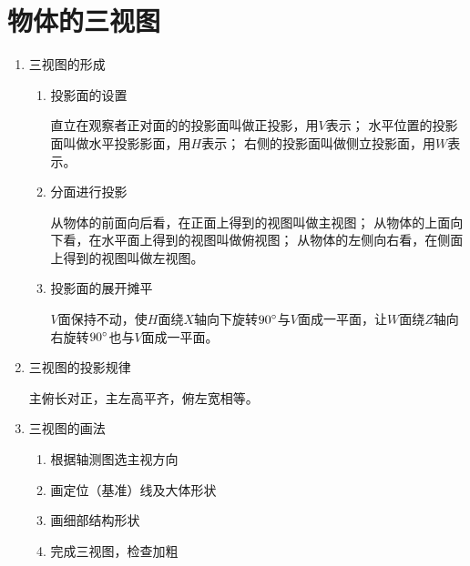 \section{物体的三视图}
\begin{enumerate}
\item 三视图的形成
\begin{enumerate}
\item 投影面的设置

直立在观察者正对面的的投影面叫做正投影，用$V$表示；
水平位置的投影面叫做水平投影影面，用$H$表示；
右侧的投影面叫做侧立投影面，用$W$表示。
\item 分面进行投影

从物体的前面向后看，在正面上得到的视图叫做主视图；
从物体的上面向下看，在水平面上得到的视图叫做俯视图；
从物体的左侧向右看，在侧面上得到的视图叫做左视图。
\item 投影面的展开摊平

$V$面保持不动，使$H$面绕$X$轴向下旋转$90\degree$与$V$面成一平面，让$W$面绕$Z$轴向右旋转$90\degree$也与$V$面成一平面。
\end{enumerate}
\item 三视图的投影规律

主俯长对正，主左高平齐，俯左宽相等。
\item 三视图的画法
\begin{enumerate}
\item 根据轴测图选主视方向
\item 画定位（基准）线及大体形状
\item 画细部结构形状
\item 完成三视图，检查加粗
\end{enumerate}
\end{enumerate}
\endinput